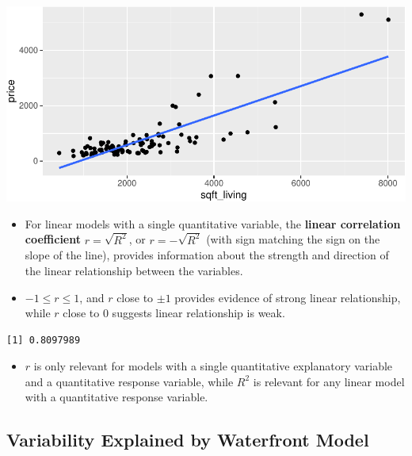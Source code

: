 \documentclass[
  letterpaper,
  DIV=11,
  numbers=noendperiod]{scrreprt}
\newenvironment{Shaded}{\begin{snugshade}}{\end{snugshade}}
\newcommand{\FunctionTok}[1]{\textcolor[rgb]{0.28,0.35,0.67}{#1}}
\newcommand{\NormalTok}[1]{\textcolor[rgb]{0.00,0.23,0.31}{#1}}
\newcommand{\SpecialCharTok}[1]{\textcolor[rgb]{0.37,0.37,0.37}{#1}}
\providecommand{\tightlist}{%
  \setlength{\itemsep}{0pt}\setlength{\parskip}{0pt}}\usepackage{longtable,booktabs,array}
\begin{document}
\includegraphics{Ch2_files/figure-pdf/unnamed-chunk-30-1.pdf}

\begin{itemize}
\item
  For linear models with a single quantitative variable, the
  \textbf{linear correlation coefficient} \(r=\sqrt{R^2}\), or
  \(r=-\sqrt{R^2}\) (with sign matching the sign on the slope of the
  line), provides information about the strength and direction of the
  linear relationship between the variables.
\item
  \(-1 \leq r \leq 1\), and \(r\) close to \(\pm1\) provides evidence of
  strong linear relationship, while \(r\) close to 0 suggests linear
  relationship is weak.
\end{itemize}

\begin{Shaded}
\end{Shaded}

\begin{verbatim}
[1] 0.8097989
\end{verbatim}

\begin{itemize}
\tightlist
\item
  \(r\) is only relevant for models with a single quantitative
  explanatory variable and a quantitative response variable, while
  \(R^2\) is relevant for any linear model with a quantitative response
  variable.
\end{itemize}

\subsection{Variability Explained by Waterfront
Model}\label{variability-explained-by-waterfront-model}
\end{document}
